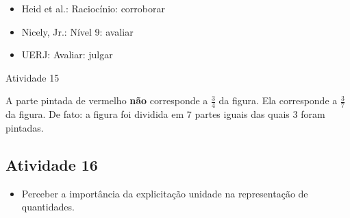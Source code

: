 \begin{multicols}{2}
\vspace{.1cm}

 \vspace{.1cm}
\begin{itemize} %
    \item       Heid et al.: Raciocínio: corroborar
    \item       Nicely, Jr.: Nível 9: avaliar
    \item       UERJ: Avaliar: julgar
\end{itemize} %


\begin{resposta*}{Atividade 15}

  A parte pintada de vermelho   {\bf não}   corresponde a   $\frac{3}{4}$ da figura. Ela corresponde a   $\frac{3}{7}$ da figura. De fato: a figura foi dividida em   $7$ partes iguais das quais   $3$ foram pintadas.

\end{resposta*}



\subsection{Atividade 16}



  \vspace{.1cm}

\begin{itemize} %
    \item       Perceber a importância da explicitação unidade na representação de quantidades.
\end{itemize} %


  \vspace{.1cm}

  \vspace{.1cm}


\end{multicols}
